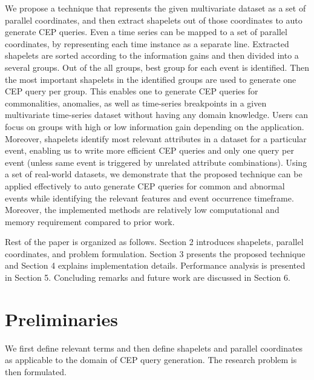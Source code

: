 \documentclass[conference]{IEEEtran}  %
\begin{document}
We propose a technique that represents the given multivariate dataset as a set of parallel coordinates, and then extract shapelets out of those coordinates to auto generate CEP queries. Even a time series can be mapped to a set of parallel coordinates, by representing each time instance as a separate line. Extracted shapelets are sorted according to the information gains and then divided into a several groups. Out of the all groups, best group for each event is identified. Then the most important shapelets in the identified groups are used to generate one CEP query per group. This enables one to generate CEP queries for commonalities, anomalies, as well as time-series breakpoints in a given multivariate time-series dataset without having any domain knowledge. Users can focus on groups with high or low information gain depending on the application. Moreover, shapelets identify most relevant attributes in a dataset for a particular event, enabling us to write more efficient CEP queries and only one query per event (unless same event is triggered by unrelated attribute combinations). Using a set of real-world datasets, we demonstrate that the proposed technique can be applied effectively to auto generate CEP queries for common and abnormal events while identifying the relevant features and event occurrence timeframe. Moreover, the implemented methods are relatively low computational and memory requirement compared to prior work.

Rest of the paper is organized as follows. Section 2 introduces shapelets, parallel coordinates, and problem formulation. Section 3 presents the proposed technique and Section 4 explains implementation details. Performance analysis is presented in Section 5. Concluding remarks and future work are discussed in Section 6.

\section{Preliminaries}
We first define relevant terms and then define shapelets and parallel coordinates as applicable to the domain of CEP query generation. The research problem is then formulated.
\end{document}
